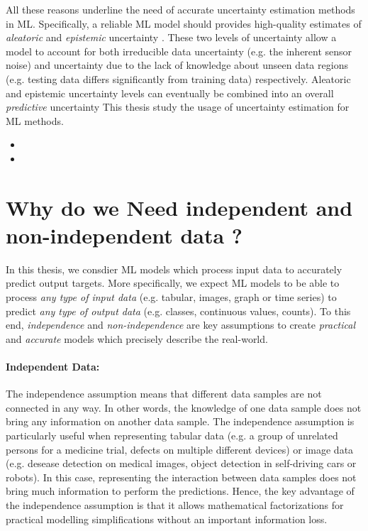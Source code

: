 All these reasons underline the need of accurate uncertainty estimation methods in ML. 
Specifically, a reliable ML model should provides high-quality estimates of \emph{aleatoric} and \emph{epistemic} uncertainty \citep{Gal2016a}.
These two levels of uncertainty allow a model to account for both irreducible data uncertainty (e.g. the inherent sensor noise) and uncertainty due to the lack of knowledge about unseen data regions (e.g. testing data differs significantly from training data) respectively.
Aleatoric and epistemic uncertainty levels can eventually be combined into an overall \emph{predictive} uncertainty \citep{Gal2016a}
This thesis study the usage of uncertainty estimation for ML methods.

\begin{itemize}
    \item {}
    \item {}
\end{itemize}

\section{Why do we Need independent and non-independent data ?}

In this thesis, we consdier ML models which process input data to accurately predict output targets. 
More specifically, we expect ML models to be able to process \emph{any type of input data} (e.g. tabular, images, graph or time series) to predict \emph{any type of output data} (e.g. classes, continuous values, counts).
To this end, \emph{independence} and \emph{non-independence} are key assumptions to create \emph{practical} and \emph{accurate} models which precisely describe the real-world. 

\paragraph*{Independent Data:} The independence assumption means that different data samples are not connected in any way. In other words, the knowledge of one data sample does not bring any information on another data sample.
The independence assumption is particularly useful when representing tabular data (e.g. a group of unrelated persons for a medicine trial, defects on multiple different devices) or image data (e.g. desease detection on medical images, object detection in self-driving cars or robots).
In this case, representing the interaction between data samples does not bring much information to perform the predictions.
Hence, the key advantage of the independence assumption is that it allows mathematical factorizations for practical modelling simplifications \citep{bishop} without an important information loss.

